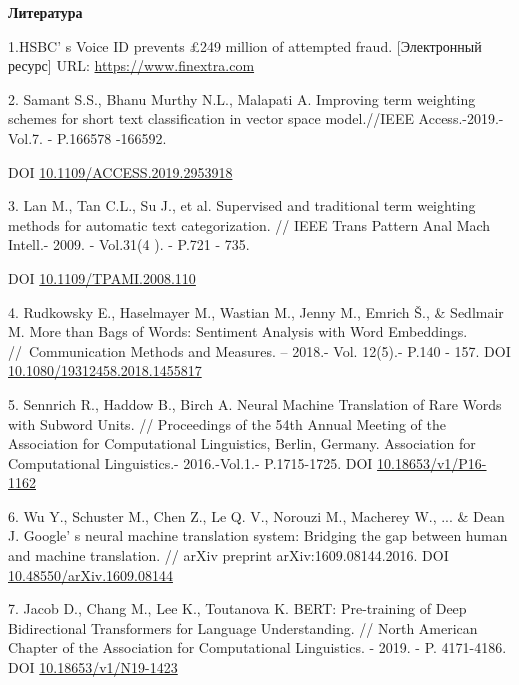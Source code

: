 \begin{center}
{\bfseries Литература}
\end{center}

\begin{references}
1.HSBC' s Voice ID prevents £249 million of attempted
fraud. {[}Электронный ресурс{]} URL:
\href{https://www.finextra.com/newsarticle/37989/hsbcs-voice-id-prevents-249-million-of-attempted-fraud}{https://www.finextra.com}

2. Samant S.S., Bhanu Murthy N.L., Malapati A. Improving term weighting
schemes for short text classification in vector space model.//IEEE
Access.-2019.- Vol.7. - P.166578 -166592.

DOI
\href{https://doi.org/10.1109/ACCESS.2019.2953918}{10.1109/ACCESS.2019.2953918}

3. Lan M., Tan C.L., Su J., et al. Supervised and traditional term
weighting methods for automatic text categorization. // IEEE Trans
Pattern Anal Mach Intell.- 2009. - Vol.31(4 ). - P.721 - 735.

DOI
\href{https://doi.org/10.1109/tpami.2008.110}{10.1109/TPAMI.2008.110}

4. Rudkowsky E., Haselmayer M., Wastian M., Jenny M., Emrich Š., \&
Sedlmair M. More than Bags of Words: Sentiment Analysis with Word
Embeddings. //~Communication Methods and Measures. -- 2018.- Vol.
12(5).- P.140 - 157. DOI
\href{http://dx.doi.org/10.1080/19312458.2018.1455817}{10.1080/19312458.2018.1455817}

5. Sennrich R., Haddow B., Birch A. Neural Machine Translation of Rare
Words with Subword Units. // Proceedings of the 54th Annual Meeting of
the Association for Computational Linguistics, Berlin, Germany.
Association for Computational Linguistics.- 2016.-Vol.1.- P.1715-1725.
DOI \href{https://doi.org/10.18653/v1/P16-1162}{10.18653/v1/P16-1162}

6. Wu Y., Schuster M., Chen Z., Le Q. V., Norouzi M., Macherey W., ...
\& Dean J. Google' s neural machine translation system:
Bridging the gap between human and machine translation. // arXiv
preprint arXiv:1609.08144.2016. DOI
\href{http://dx.doi.org/10.48550/arXiv.1609.08144}{10.48550/arXiv.1609.08144}

7. Jacob D., Chang M., Lee K., Toutanova K. BERT: Pre-training of Deep
Bidirectional Transformers for Language Understanding. // North American
Chapter of the Association for Computational Linguistics. - 2019. - P.
4171-4186. DOI
\href{https://doi.org/10.18653/v1/N19-1423}{10.18653/v1/N19-1423}


\end{references}

